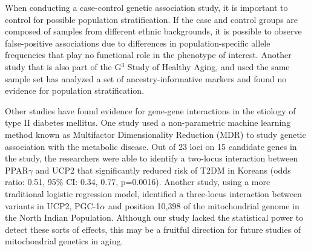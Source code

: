 When conducting a case-control genetic association study, it is important to control for possible population stratification.  If the case and control groups are composed of samples from different ethnic backgrounds, it is possible to observe false-positive associations due to differences in population-specific allele frequencies that play no functional role in the phenotype of interest.  Another study that is also part of the G$^{3}$ Study of Healthy Aging, and used the same sample set has analyzed a set of ancestry-informative markers and found no evidence for population stratification\cite{halaschek2012}.

Other studies have found evidence for gene-gene interactions in the etiology of type II diabetes mellitus.  One study used a non-parametric machine learning method known as Multifactor Dimensionality Reduction (MDR) to study genetic association with the metabolic disease.  Out of 23 loci on 15 candidate genes in the study, the researchers were able to identify a two-locus interaction between PPAR$\gamma$ and UCP2 that significantly reduced risk of T2DM in Koreans (odds ratio: 0.51, 95\% CI: {0.34, 0.77}, p=0.0016)\cite{cho2004multifactor}.  Another study, using a more traditional logistic regression model, identified a three-locus interaction between variants in UCP2, PGC-1$\alpha$ and position 10,398 of the mitochondrial genome in the North Indian Population\cite{bhat2007pgc}.  Although our study lacked the statistical power to detect these sorts of effects, this may be a fruitful direction for future studies of mitochondrial genetics in aging.
\newpage
